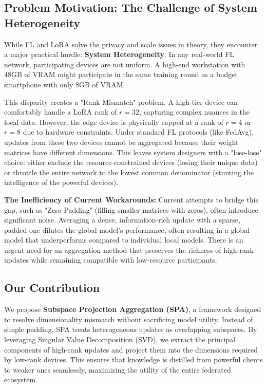 \documentclass[conference]{IEEEtran}
\begin{document}
\subsection{Problem Motivation: The Challenge of System Heterogeneity}
While FL and LoRA solve the privacy and scale issues in theory, they encounter a major practical hurdle: \textbf{System Heterogeneity}. In any real-world FL network, participating devices are not uniform. A high-end workstation with 48GB of VRAM might participate in the same training round as a budget smartphone with only 8GB of VRAM. 

This disparity creates a "Rank Mismatch" problem. A high-tier device can comfortably handle a LoRA rank of $r=32$, capturing complex nuances in the local data. However, the edge device is physically capped at a rank of $r=4$ or $r=8$ due to hardware constraints. Under standard FL protocols (like FedAvg), updates from these two devices cannot be aggregated because their weight matrices have different dimensions. This leaves system designers with a "lose-lose" choice: either exclude the resource-constrained devices (losing their unique data) or throttle the entire network to the lowest common denominator (stunting the intelligence of the powerful devices). 

\textbf{The Inefficiency of Current Workarounds:} Current attempts to bridge this gap, such as "Zero-Padding" (filling smaller matrices with zeros), often introduce significant noise. Averaging a dense, information-rich update with a sparse, padded one dilutes the global model’s performance, often resulting in a global model that underperforms compared to individual local models. There is an urgent need for an aggregation method that preserves the richness of high-rank updates while remaining compatible with low-resource participants.

\subsection{Our Contribution}
We propose \textbf{Subspace Projection Aggregation (SPA)}, a framework designed to resolve dimensionality mismatch without sacrificing model utility. Instead of simple padding, SPA treats heterogeneous updates as overlapping subspaces. By leveraging Singular Value Decomposition (SVD), we extract the principal components of high-rank updates and project them into the dimensions required by low-rank devices. This ensures that knowledge is distilled from powerful clients to weaker ones seamlessly, maximizing the utility of the entire federated ecosystem.
\end{document}
